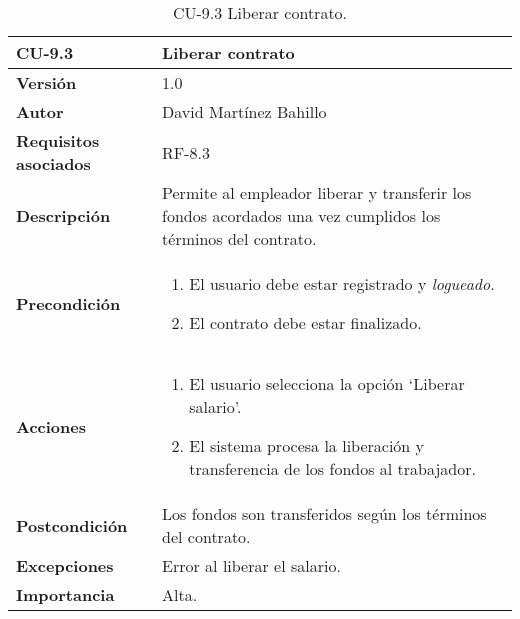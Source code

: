 \begin{table}[p]
	\centering
	\begin{tabularx}{\linewidth}{ p{} p{} }
		\toprule
		\textbf{CU-9.3}  & \textbf{Liberar contrato}\\
		\midrule
		\textbf{Versión}              & 1.0    \\
		\textbf{Autor}                & David Martínez Bahillo \\
		\textbf{Requisitos asociados} & RF-8.3 \\
		\textbf{Descripción}          & Permite al empleador liberar y transferir los fondos acordados una vez cumplidos los términos del contrato. \\
		\textbf{Precondición}         &  
		\begin{enumerate}
			\item El usuario debe estar registrado y \textit{logueado}.
			\item El contrato debe estar finalizado.
		\end{enumerate}\\
		\textbf{Acciones}             &
		\begin{enumerate}
			\item El usuario selecciona la opción `Liberar salario'.
			\item El sistema procesa la liberación y transferencia de los fondos al trabajador.
		\end{enumerate}\\
		\textbf{Postcondición}        & Los fondos son transferidos según los términos del contrato. \\
		\textbf{Excepciones}          & Error al liberar el salario. \\
		\textbf{Importancia}          & Alta. \\
		\bottomrule
	\end{tabularx}
	\caption{CU-9.3 Liberar contrato.}
\end{table}


